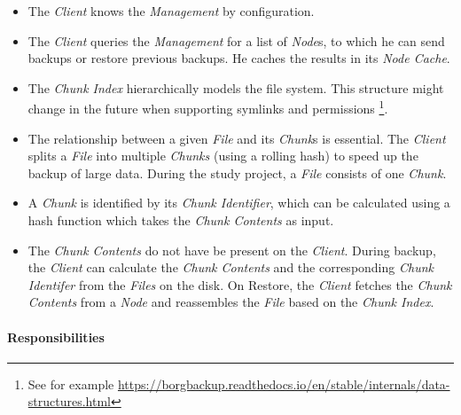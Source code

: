 \begin{itemize}
    \item The \emph{Client} knows the \emph{Management} by configuration.
    \item The \emph{Client} queries the \emph{Management} for a list of \emph{Node}s, to which he can send backups or restore previous backups. He caches the results in its \emph{Node Cache}.
    \item The \emph{Chunk Index} hierarchically models the file system. This structure might change in the future when supporting symlinks and permissions \footnote{See for example \url{https://borgbackup.readthedocs.io/en/stable/internals/data-structures.html}}.
    \item The relationship between a given \emph{File} and its \emph{Chunk}s is essential. The \emph{Client} splits a \emph{File} into multiple \emph{Chunks} (using a rolling hash) to speed up the backup of large data. During the study project, a \emph{File} consists of one \emph{Chunk}.
    \item A \emph{Chunk} is identified by its \emph{Chunk Identifier}, which can be calculated using a hash function which takes the \emph{Chunk Contents}  as input.
    \item The \emph{Chunk Contents} do not have be present on the \emph{Client}. During backup, the \emph{Client} can calculate the \emph{Chunk Contents} and the corresponding \emph{Chunk Identifer} from the \emph{Files} on the disk. On Restore, the \emph{Client} fetches the \emph{Chunk Contents} from a \emph{Node} and reassembles the \emph{File} based on the \emph{Chunk Index}.
\end{itemize}


\paragraph{Responsibilities}


